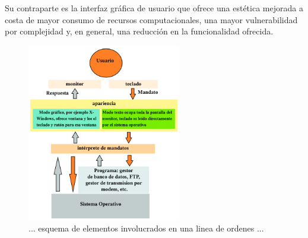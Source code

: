 Su contraparte es la interfaz gráfica de usuario que ofrece una estética mejorada a costa de mayor consumo de recursos computacionales, una mayor vulnerabilidad por complejidad y, en general, una reducción en la funcionalidad ofrecida.\\

\begin{figure}[htb]
\centering
\includegraphics[width=0.6\textwidth]{imagenes/lineaDeComandos.png}%
\caption{... esquema de elementos involucrados en una linea de ordenes ...}
\label{contexto:figura}
\end{figure}


%
